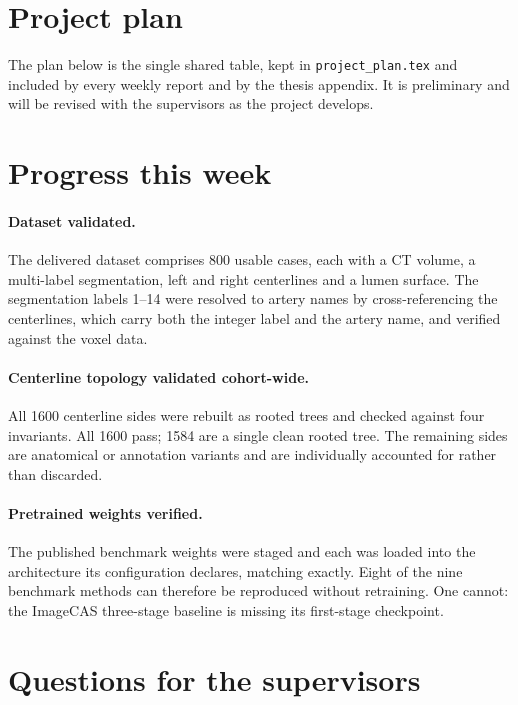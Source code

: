 
\section*{Project plan}

The plan below is the single shared table, kept in \texttt{project\_plan.tex} and included by
every weekly report and by the thesis appendix. It is preliminary and will be revised with the
supervisors as the project develops.



\section*{Progress this week}

\paragraph{Dataset validated.} The delivered dataset comprises 800 usable cases, each with a
CT volume, a multi-label segmentation, left and right centerlines and a lumen surface. The
segmentation labels 1--14 were resolved to artery names by cross-referencing the centerlines,
which carry both the integer label and the artery name, and verified against the voxel data.

\paragraph{Centerline topology validated cohort-wide.} All 1600 centerline sides were rebuilt
as rooted trees and checked against four invariants. All 1600 pass; 1584 are a single clean
rooted tree. The remaining sides are anatomical or annotation variants and are individually
accounted for rather than discarded.

\paragraph{Pretrained weights verified.} The published benchmark weights were staged and each
was loaded into the architecture its configuration declares, matching exactly. Eight of the
nine benchmark methods can therefore be reproduced without retraining. One cannot: the
ImageCAS three-stage baseline is missing its first-stage checkpoint.

\section*{Questions for the supervisors}

